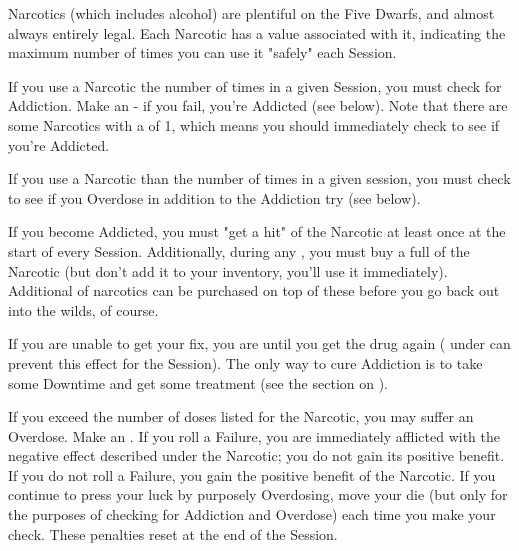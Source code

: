 

Narcotics (which includes alcohol) are plentiful on the Five Dwarfs, and almost always entirely legal. Each Narcotic has a \MAX value associated with it, indicating the maximum number of times you can use it "safely" each Session.

If you use a Narcotic the \MAX number of times in a given Session, you must check for Addiction.  Make an \RSTRY{\FOC} - if you fail, you're Addicted (see below). Note that there are some Narcotics with a \MAX of 1, which means you should immediately check to see if you're Addicted.

If you use a Narcotic  than the \MAX number of times in a given session, you must check to see if you Overdose in addition to the Addiction try (see below).



If you become Addicted, you must "get a hit" of the Narcotic at least once at the start of every Session.  Additionally, during any , you must buy a full \UD of the Narcotic (but don't add it to your inventory, you'll use it immediately).  Additional \UD of narcotics can be purchased on top of these before you go back out into the wilds, of course.

If you are unable to get your fix, you are  until you get the drug again ( under  can prevent this effect for the Session). The only way to cure Addiction is to take some Downtime and get some treatment (see the section on ).

\cbreak


If you exceed the \MAX number of doses listed for the Narcotic, you may suffer an Overdose. Make an \RSTRY{\FOC}. If you roll a Failure, you are immediately afflicted with the negative effect described under the Narcotic; you do not gain its positive benefit. If you do not roll a Failure, you gain the positive benefit of the Narcotic. If you continue to press your luck by purposely Overdosing, move your \FOC die \DCDOWN (but only for the purposes of checking for Addiction and Overdose) each time you make your check. These penalties reset at the end of the Session.

